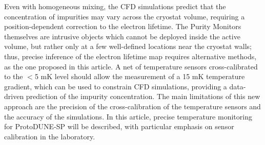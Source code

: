 Even with homogeneous mixing, the CFD simulations predict that the concentration of impurities may vary across the cryostat volume, requiring a position-dependent correction to the electron lifetime. The Purity Monitors themselves are intrusive objects which cannot be deployed inside the active volume, but rather only at a few well-defined locations near the cryostat walls; thus, precise inference of the electron lifetime map requires alternative methods, as the one proposed in this article. A net of temperature sensors cross-calibrated to the $<$5 mK level should allow the measurement of a 15 mK temperature gradient, which can be used to constrain CFD simulations, providing a data-driven prediction of the impurity concentration. The main limitations of this new approach are the precision of the cross-calibration of the temperature sensors and the accuracy of the simulations. In this article, precise temperature monitoring for ProtoDUNE-SP will be described, with particular emphasis on sensor calibration in the laboratory.

